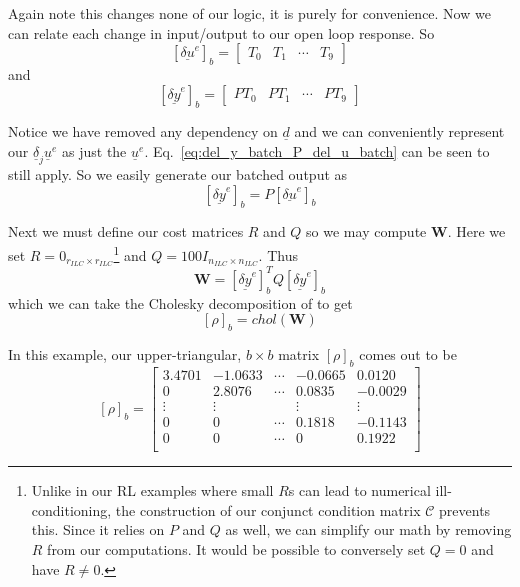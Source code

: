 Again note this changes none of our logic, it is purely for convenience. Now we can relate each change in input/output to our open loop response. So 
\begin{equation}
    {\left[\underline{\delta u}^e\right]}_b =
    \begin{bmatrix}
        T_0 & T_1 & \cdots & T_9
    \end{bmatrix}
\end{equation}
and
\begin{equation}
    {\left[\underline{\delta y}^e\right]}_b  = 
    \begin{bmatrix}
        PT_0 & PT_1 & \cdots & PT_9
    \end{bmatrix}
\end{equation}

Notice we have removed any dependency on $\underline{d}$ and we can conveniently represent our $\underline{\delta}_j\underline{u}^e$ as just the $\underline{u}^e$. Eq.~\ref{eq:del_y_batch_P_del_u_batch} can be seen to still apply. So we easily generate our batched output as
\begin{equation}
    {\left[\underline{\delta y}^e\right]}_b  = P {\left[\underline{\delta u}^e\right]}_b
\end{equation}

Next we must define our cost matrices $R$ and $Q$ so we may compute \textbf{W}. Here we set $R = 0_{r_{ILC} \times r_{ILC}}$\footnote{Unlike in our RL examples where small $R$s can lead to numerical ill-conditioning, the construction of our conjunct condition matrix $\mathcal{C}$ prevents this. Since it relies on $P$ and $Q$ as well, we can simplify our math by removing $R$ from our computations. It would be possible to conversely set $Q = 0$ and have $R \neq 0$.} and $Q = 100I_{n_{ILC} \times n_{ILC}}$. Thus
\begin{equation}
    \textbf{W} = {\left[\underline{\delta y}^e\right]}_b^T Q {\left[\underline{\delta y}^e\right]}_b
\end{equation}
which we can take the Cholesky decomposition of to get
\begin{equation}
    {\left[\rho\right]}_b = chol(\textbf{W})
\end{equation}

In this example, our upper-triangular, $b \times b$ matrix ${\left[\rho\right]}_b$ comes out to be
\begin{equation}
    {\left[\rho\right]}_b = 
    \begin{bmatrix}
        3.4701 &  -1.0633 & \cdots & -0.0665  &  0.0120 \\
        0  &  2.8076 & \cdots & 0.0835 &  -0.0029 \\
        \vdots & \vdots &  & \vdots & \vdots \\
        0 &  0 & \cdots & 0.1818 &  -0.1143 \\
        0  &  0 & \cdots & 0 &  0.1922 \\
    \end{bmatrix}
\end{equation}

